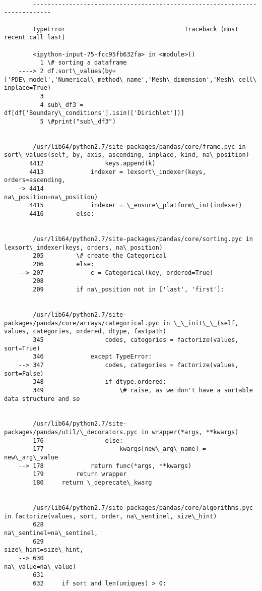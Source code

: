 \documentclass[11pt]{article}
\begin{document}
    \begin{Verbatim}[commandchars=\\\{\}]

        ---------------------------------------------------------------------------

        TypeError                                 Traceback (most recent call last)

        <ipython-input-75-fcc95fb632fa> in <module>()
          1 \# sorting a dataframe
    ----> 2 df.sort\_values(by=['PDE\_model','Numerical\_method\_name','Mesh\_dimension','Mesh\_cell\_type','Mesh\_number\_of\_elements'], inplace=True)
          3 
          4 sub\_df3 = df[df['Boundary\_conditions'].isin(['Dirichlet'])]
          5 \#print("sub\_df3")


        /usr/lib64/python2.7/site-packages/pandas/core/frame.pyc in sort\_values(self, by, axis, ascending, inplace, kind, na\_position)
       4412                 keys.append(k)
       4413             indexer = lexsort\_indexer(keys, orders=ascending,
    -> 4414                                       na\_position=na\_position)
       4415             indexer = \_ensure\_platform\_int(indexer)
       4416         else:


        /usr/lib64/python2.7/site-packages/pandas/core/sorting.pyc in lexsort\_indexer(keys, orders, na\_position)
        205         \# create the Categorical
        206         else:
    --> 207             c = Categorical(key, ordered=True)
        208 
        209         if na\_position not in ['last', 'first']:


        /usr/lib64/python2.7/site-packages/pandas/core/arrays/categorical.pyc in \_\_init\_\_(self, values, categories, ordered, dtype, fastpath)
        345                 codes, categories = factorize(values, sort=True)
        346             except TypeError:
    --> 347                 codes, categories = factorize(values, sort=False)
        348                 if dtype.ordered:
        349                     \# raise, as we don't have a sortable data structure and so


        /usr/lib64/python2.7/site-packages/pandas/util/\_decorators.pyc in wrapper(*args, **kwargs)
        176                 else:
        177                     kwargs[new\_arg\_name] = new\_arg\_value
    --> 178             return func(*args, **kwargs)
        179         return wrapper
        180     return \_deprecate\_kwarg


        /usr/lib64/python2.7/site-packages/pandas/core/algorithms.pyc in factorize(values, sort, order, na\_sentinel, size\_hint)
        628                                            na\_sentinel=na\_sentinel,
        629                                            size\_hint=size\_hint,
    --> 630                                            na\_value=na\_value)
        631 
        632     if sort and len(uniques) > 0:



\end{Verbatim}
\end{document}

